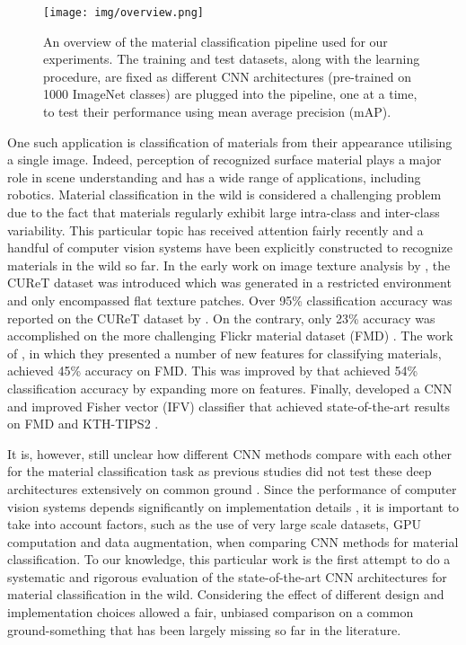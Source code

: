\documentclass[a4paper,twoside]{article}
\begin{document}
\begin{figure*}[!t]
\centering
\texttt{[image: img/overview.png]}
\caption{An overview of the material classification pipeline used for our experiments. The training and test datasets, along with the learning procedure, are fixed as different CNN architectures (pre-trained on 1000 ImageNet classes) are plugged into the pipeline, one at a time, to test their performance using mean average precision (mAP).}
\label{overview}
\end{figure*}

One such application is classification of materials from their appearance utilising a single image. Indeed, perception of recognized surface material plays a major role in scene understanding and has a wide range of applications, including robotics. Material classification in the wild is considered a challenging problem due to the fact that materials regularly exhibit large intra-class and inter-class variability. This particular topic has received attention fairly recently and a handful of computer vision systems have been explicitly constructed to recognize materials in the wild so far. In the early work on image texture analysis by \cite{11}, the CUReT dataset was introduced which was generated in a restricted environment and only encompassed flat texture patches. Over 95\% classification accuracy was reported on the CUReT dataset by \cite{12}. On the contrary, only 23\% accuracy was accomplished on the more challenging Flickr material dataset (FMD) \cite{13}. The work of \cite{14}, in which they presented a number of new features for classifying materials, achieved 45\% accuracy on FMD. This was improved by \cite{15} that achieved 54\% classification accuracy by expanding more on features. Finally, \cite{16} developed a CNN and improved Fisher vector (IFV) classifier that achieved state-of-the-art results on FMD and KTH-TIPS2 \cite{17}.

It is, however, still unclear how different CNN methods compare with each other for the material classification task as previous studies did not test these deep architectures extensively on common ground \cite{24}. Since the performance of computer vision systems depends significantly on implementation details \cite{20}, it is important to take into account factors, such as the use of very large scale datasets, GPU computation and data augmentation, when comparing CNN methods for material classification. To our knowledge, this particular work is the first attempt to do a systematic and rigorous evaluation of the state-of-the-art CNN architectures for material classification in the wild. Considering the effect of different design and implementation choices allowed a fair, unbiased comparison on a common ground-something that has been largely missing so far in the literature.
\end{document}

